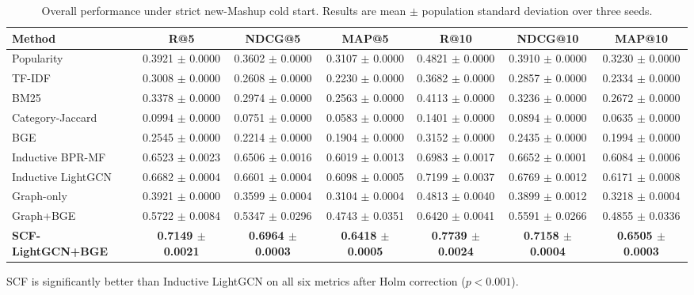 \begin{table}[t]
\centering
\caption{Overall performance under strict new-Mashup cold start. Results are mean $\pm$ population standard deviation over three seeds.}
\label{tab:main_results}
\small
\begin{tabular}{lcccccc}
\toprule
Method & R@5 & NDCG@5 & MAP@5 & R@10 & NDCG@10 & MAP@10 \\
\midrule
Popularity & 0.3921 $\pm$ 0.0000 & 0.3602 $\pm$ 0.0000 & 0.3107 $\pm$ 0.0000 & 0.4821 $\pm$ 0.0000 & 0.3910 $\pm$ 0.0000 & 0.3230 $\pm$ 0.0000 \\
TF-IDF & 0.3008 $\pm$ 0.0000 & 0.2608 $\pm$ 0.0000 & 0.2230 $\pm$ 0.0000 & 0.3682 $\pm$ 0.0000 & 0.2857 $\pm$ 0.0000 & 0.2334 $\pm$ 0.0000 \\
BM25 & 0.3378 $\pm$ 0.0000 & 0.2974 $\pm$ 0.0000 & 0.2563 $\pm$ 0.0000 & 0.4113 $\pm$ 0.0000 & 0.3236 $\pm$ 0.0000 & 0.2672 $\pm$ 0.0000 \\
Category-Jaccard & 0.0994 $\pm$ 0.0000 & 0.0751 $\pm$ 0.0000 & 0.0583 $\pm$ 0.0000 & 0.1401 $\pm$ 0.0000 & 0.0894 $\pm$ 0.0000 & 0.0635 $\pm$ 0.0000 \\
BGE & 0.2545 $\pm$ 0.0000 & 0.2214 $\pm$ 0.0000 & 0.1904 $\pm$ 0.0000 & 0.3152 $\pm$ 0.0000 & 0.2435 $\pm$ 0.0000 & 0.1994 $\pm$ 0.0000 \\
Inductive BPR-MF & 0.6523 $\pm$ 0.0023 & 0.6506 $\pm$ 0.0016 & 0.6019 $\pm$ 0.0013 & 0.6983 $\pm$ 0.0017 & 0.6652 $\pm$ 0.0001 & 0.6084 $\pm$ 0.0006 \\
Inductive LightGCN & 0.6682 $\pm$ 0.0004 & 0.6601 $\pm$ 0.0004 & 0.6098 $\pm$ 0.0005 & 0.7199 $\pm$ 0.0037 & 0.6769 $\pm$ 0.0012 & 0.6171 $\pm$ 0.0008 \\
Graph-only & 0.3921 $\pm$ 0.0000 & 0.3599 $\pm$ 0.0004 & 0.3104 $\pm$ 0.0004 & 0.4813 $\pm$ 0.0040 & 0.3899 $\pm$ 0.0012 & 0.3218 $\pm$ 0.0004 \\
Graph+BGE & 0.5722 $\pm$ 0.0084 & 0.5347 $\pm$ 0.0296 & 0.4743 $\pm$ 0.0351 & 0.6420 $\pm$ 0.0041 & 0.5591 $\pm$ 0.0266 & 0.4855 $\pm$ 0.0336 \\
\textbf{SCF-LightGCN+BGE} & \textbf{0.7149 $\pm$ 0.0021} & \textbf{0.6964 $\pm$ 0.0003} & \textbf{0.6418 $\pm$ 0.0005} & \textbf{0.7739 $\pm$ 0.0024} & \textbf{0.7158 $\pm$ 0.0004} & \textbf{0.6505 $\pm$ 0.0003} \\
\bottomrule
\end{tabular}
\vspace{2pt}
\begin{minipage}{0.98\linewidth}
\footnotesize
SCF is significantly better than Inductive LightGCN on all six metrics after Holm correction ($p<0.001$).
\end{minipage}
\end{table}

